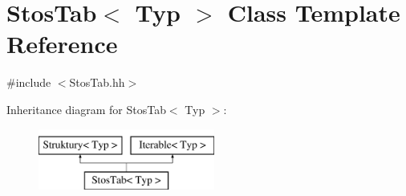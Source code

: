 \hypertarget{class_stos_tab}{\section{Stos\-Tab$<$ Typ $>$ Class Template Reference}
\label{class_stos_tab}
}


{\ttfamily \#include $<$Stos\-Tab.\-hh$>$}

Inheritance diagram for Stos\-Tab$<$ Typ $>$\-:\begin{figure}[H]
\begin{center}
\leavevmode
\includegraphics[height=2.000000cm]{class_stos_tab}
\end{center}
\end{figure}
